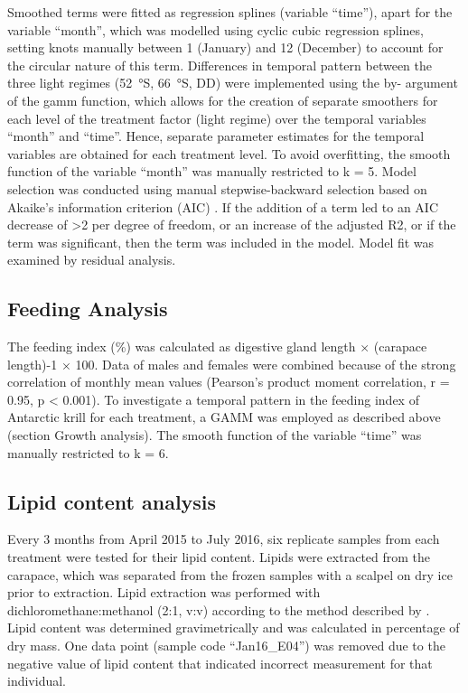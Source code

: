 Smoothed terms were fitted as regression splines (variable “time”), apart for
the variable “month”, which was modelled using cyclic cubic regression splines,
setting knots manually between 1 (January) and 12 (December) to account for the
circular nature of this term. Differences in temporal pattern between the three
light regimes (\SI{52}{\degree}S, \SI{66}{\degree}S, DD) were implemented using
the by- argument of the gamm function, which allows for the creation of
separate smoothers for each level of the treatment factor (light regime) over
the temporal variables “month” and “time”. Hence, separate parameter estimates
for the temporal variables are obtained for each treatment level. To avoid
overfitting, the smooth function of the variable “month” was manually
restricted to k = 5. Model selection was conducted using manual
stepwise-backward selection based on Akaike’s information criterion (AIC)
\citep{akaike_likelihood_1981}. If the addition of a term led to an AIC
decrease of >2 per degree of freedom, or an increase of the adjusted R2, or if
the term was significant, then the term was included in the model. Model fit
was examined by residual analysis.

\subsection{Feeding Analysis}

The feeding index (\%) was calculated as digestive gland length $\times$
(carapace length)-1 $\times$ 100. Data of males and females were combined
because of the strong correlation of monthly mean values (Pearson’s product
moment correlation, r = 0.95, p < 0.001). To investigate a temporal pattern in
the feeding index of Antarctic krill for each treatment, a GAMM was employed as
described above (section Growth analysis). The smooth function of the variable
“time” was manually restricted to k = 6.

\subsection{Lipid content analysis}

Every 3 months from April 2015 to July 2016, six replicate samples from each
treatment were tested for their lipid content. Lipids were extracted from the
carapace, which was separated from the frozen samples with a scalpel on dry ice
prior to extraction. Lipid extraction was performed with
dichloromethane:methanol (2:1, v:v) according to the method described by
\citet{hagen_lipids_2000}. Lipid content was determined gravimetrically and was
calculated in percentage of dry mass. One data point (sample code “Jan16\_E04”)
was removed due to the negative value of lipid content that indicated incorrect
measurement for that individual. 


